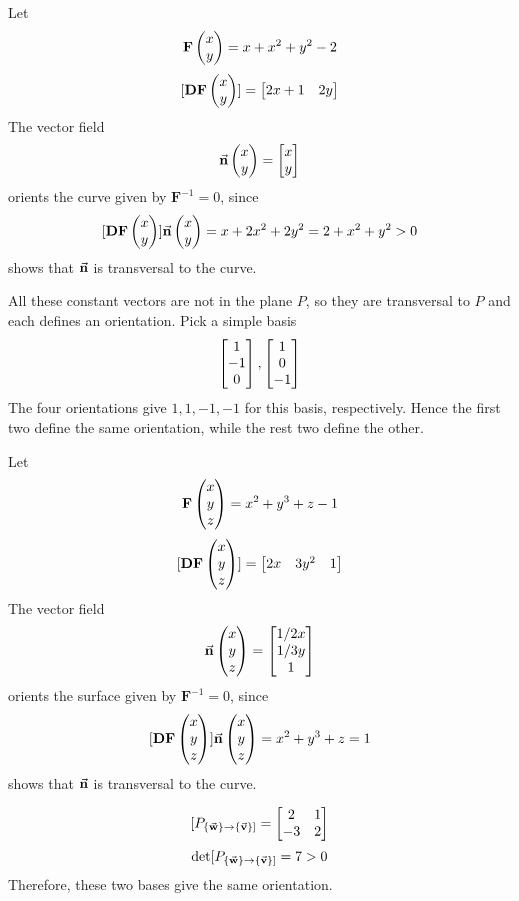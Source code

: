 \documentclass{homework}
\begin{document}
\begin{problem}{6}
  Let
    $$\mathbf{F} \begin{pmatrix}x \\ y\end{pmatrix} = x + x^2 + y^2 - 2$$
    $$[\mathbf{DF}\begin{pmatrix}x \\ y\end{pmatrix}] = \begin{bmatrix}2x + 1 & 2y\end{bmatrix}$$
  The vector field
    $$\vec{\mathbf{n}} \begin{pmatrix}x \\ y\end{pmatrix} = \begin{bmatrix}x \\ y\end{bmatrix}$$
  orients the curve given by $\mathbf{F}^{-1} = 0$, since
    $$[\mathbf{DF} \begin{pmatrix}x \\ y\end{pmatrix}]
          \vec{\mathbf{n}} \begin{pmatrix}x \\ y\end{pmatrix}
      = x + 2x^2 + 2y^2 = 2 + x^2 + y^2 > 0$$
  shows that $\vec{\mathbf{n}}$ is transversal to the curve.
\end{problem}

\begin{problem}{7}
  All these constant vectors are not in the plane $P$, so they are transversal
  to $P$ and each defines an orientation. Pick a simple basis
  $$\begin{bmatrix}1 \\ -1 \\ 0\end{bmatrix}, \begin{bmatrix}1 \\ 0 \\ -1\end{bmatrix}$$
  The four orientations give $1, 1, -1, -1$ for this basis, respectively.
  Hence the first two define the same orientation, while the rest two define the
  other.
\end{problem}

\begin{problem}{8}
  Let
    $$\mathbf{F} \begin{pmatrix}x \\ y \\ z\end{pmatrix} = x^2 + y^3 + z - 1$$
    $$[\mathbf{DF}\begin{pmatrix}x \\ y \\ z\end{pmatrix}] = \begin{bmatrix}2x & 3y^2 & 1\end{bmatrix}$$
  The vector field
    $$\vec{\mathbf{n}} \begin{pmatrix}x \\ y \\ z\end{pmatrix} = \begin{bmatrix}1/2x \\ 1/3y \\ 1\end{bmatrix}$$
  orients the surface given by $\mathbf{F}^{-1} = 0$, since
  $$[\mathbf{DF} \begin{pmatrix}x \\ y \\ z\end{pmatrix}]
        \vec{\mathbf{n}} \begin{pmatrix}x \\ y \\ z\end{pmatrix}
    = x^2 + y^3 + z = 1$$
  shows that $\vec{\mathbf{n}}$ is transversal to the curve.
\end{problem}

\begin{problem}{9}
  $$[P_{\{\vec{\mathbf{w}}\} \to \{\vec{\mathbf{v}}\}]} = \begin{bmatrix}2 & 1 \\ -3 & 2\end{bmatrix}$$
  $$\det [P_{\{\vec{\mathbf{w}}\} \to \{\vec{\mathbf{v}}\}]} = 7 > 0$$
  Therefore, these two bases give the same orientation. \QED
\end{problem}
\end{document}
